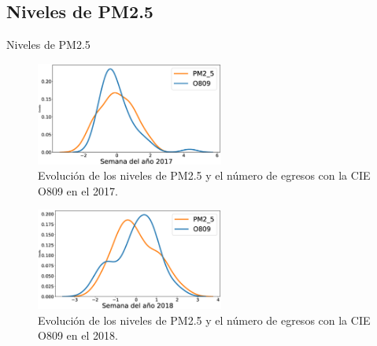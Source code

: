\documentclass[11pt]{beamer}
\begin{document}
\subsection{Niveles de PM2.5}
\begin{frame}{Niveles de PM2.5}
\begin{multicols}{2}
\begin{figure}[h!]
\begin{center}
   \includegraphics[trim=63 0 0 0,clip,width=0.55\textwidth]{PM2_5_O809_2017.eps}
   \end{center}
    \caption[Series de tiempo 2017 PM2.5 y O809]{Evolución de los niveles de PM2.5 y el número de egresos con la CIE O809 en el 2017.}
    \label{serie_de_tiempo_2017_PM25}
\end{figure}
\begin{figure}[h!]
\begin{center}
   \includegraphics[trim=63 0 0 0,clip,width=0.55\textwidth]{PM2_5_O809_2018.eps}
   \end{center}
    \caption[Series de tiempo 2018 PM2.5 y O809]{Evolución de los niveles de PM2.5 y el número de egresos con la CIE O809 en el 2018.}
    \label{serie_de_tiempo_2018_PM25}
\end{figure}
\end{multicols}
\end{frame}
\end{document}
